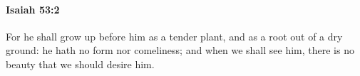 
		\paragraph{Isaiah 53:2} %
			\label{ISAIAH-53-2}

			For he shall grow up before him as a tender plant, and as a root out of a dry ground: he hath no form nor comeliness; and when we shall see him, there is no beauty that we should desire him.


